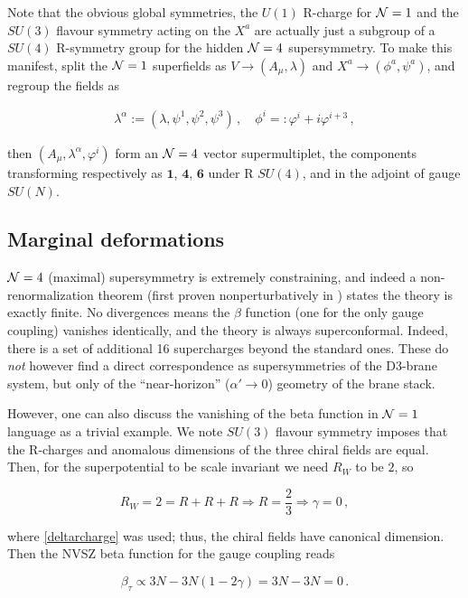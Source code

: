 Note that the obvious global symmetries, the $U(1)$ R-charge for $\mathcal{N} = 1$ and the $SU(3)$ flavour symmetry acting on the $X^a$ are actually just a subgroup of a $SU(4)$ R-symmetry group for the hidden $\mathcal{N} = 4$ supersymmetry. To make this manifest, split the $\mathcal{N}=1$ superfields as $V \rightarrow (A_\mu,\lambda)$ and $X^a \rightarrow (\phi^a,\psi^a)$, and regroup the fields as

\begin{align}
	\lambda^\alpha := (\lambda,\psi^1,\psi^2,\psi^3)\,,\quad \phi^i =: \varphi^i + i \varphi^{i+3}\,,
	\label{}
\end{align}

then $(A_\mu,\lambda^\alpha,\varphi^i)$ form an $\mathcal{N}=4$ vector supermultiplet, the components transforming respectively as $\mathbf{1}$, $\mathbf{4}$, $\mathbf{6}$ under R $SU(4)$, and in the adjoint of gauge $SU(N)$.

\subsection{Marginal deformations}

$\mathcal{N} = 4$ (maximal) supersymmetry is extremely constraining, and indeed a non-renormalization theorem (first proven nonperturbatively in \cite{seibergnr}) states the theory is exactly finite. No divergences means the $\beta$ function (one for the only gauge coupling) vanishes identically, and the theory is always superconformal. Indeed, there is a set of additional 16 supercharges beyond the standard ones. These do \emph{not} however find a direct correspondence as supersymmetries of the D3-brane system, but only of the ``near-horizon'' ($\alpha' \rightarrow 0$) geometry of the brane stack.

However, one can also discuss the vanishing of the beta function in $\mathcal{N} = 1$ language as a trivial example. We note $SU(3)$ flavour symmetry imposes that the R-charges and anomalous dimensions of the three chiral fields are equal. Then, for the superpotential to be scale invariant we need $R_W$ to be $2$, so

\begin{equation}
	R_W = 2 = R + R + R \Rightarrow R = \frac{2}{3} \Rightarrow \gamma = 0\,,
	\label{}
\end{equation}

where \eqref{deltarcharge} was used; thus, the chiral fields have canonical dimension. Then the NVSZ beta function for the gauge coupling reads

\begin{equation}
	\beta_\tau \propto 3 N - 3 N (1-2\gamma) = 3N-3N = 0\,.
\end{equation}

